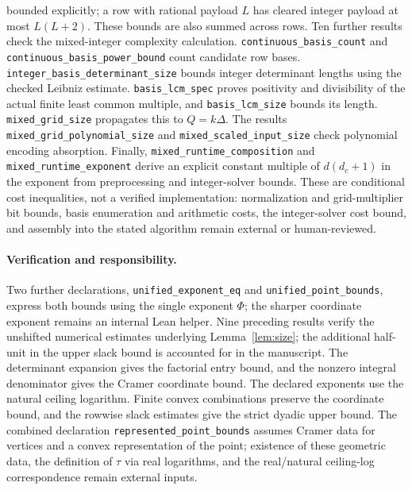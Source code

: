 \documentclass[11pt]{article}
\theoremstyle{definition}\newtheorem{definition}{Definition}[section]
\theoremstyle{remark}\newtheorem{remark}[theorem]{Remark}
\begin{document}
bounded explicitly; a row with rational payload $L$ has cleared integer payload at most $L(L+2)$. These bounds are also summed across rows. Ten further results check the mixed-integer complexity calculation. \texttt{continuous\_basis\_count} and \texttt{continuous\_basis\_power\_bound} count candidate row bases. \texttt{integer\_basis\_determinant\_size} bounds integer determinant lengths using the checked Leibniz estimate. \texttt{basis\_lcm\_spec} proves positivity and divisibility of the actual finite least common multiple, and \texttt{basis\_lcm\_size} bounds its length. \texttt{mixed\_grid\_size} propagates this to $Q=k\Delta$. The results \texttt{mixed\_grid\_polynomial\_size} and \texttt{mixed\_scaled\_input\_size} check polynomial encoding absorption. Finally, \texttt{mixed\_runtime\_composition} and \texttt{mixed\_runtime\_exponent} derive an explicit constant multiple of $d(d_c+1)$ in the exponent from preprocessing and integer-solver bounds. These are conditional cost inequalities, not a verified implementation: normalization and grid-multiplier bit bounds, basis enumeration and arithmetic costs, the integer-solver cost bound, and assembly into the stated algorithm remain external or human-reviewed.

\paragraph{Verification and responsibility.}
Two further declarations, \texttt{unified\_exponent\_eq} and \texttt{unified\_point\_bounds}, express both bounds using the single exponent $\Phi$; the sharper coordinate exponent remains an internal Lean helper. Nine preceding results verify the unshifted numerical estimates underlying Lemma~\ref{lem:size}; the additional half-unit in the upper slack bound is accounted for in the manuscript. The determinant expansion gives the factorial entry bound, and the nonzero integral denominator gives the Cramer coordinate bound. The declared exponents use the natural ceiling logarithm. Finite convex combinations preserve the coordinate bound, and the rowwise slack estimates give the strict dyadic upper bound. The combined declaration \texttt{represented\_point\_bounds} assumes Cramer data for vertices and a convex representation of the point; existence of these geometric data, the definition of $\tau$ via real logarithms, and the real/natural ceiling-log correspondence remain external inputs.
\end{document}
